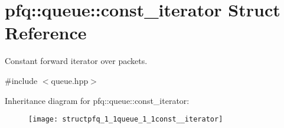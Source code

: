 \hypertarget{structpfq_1_1queue_1_1const__iterator}{\section{pfq\+:\+:queue\+:\+:const\+\_\+iterator Struct Reference}
\label{structpfq_1_1queue_1_1const__iterator}
}


Constant forward iterator over packets.  




{\ttfamily \#include $<$queue.\+hpp$>$}

Inheritance diagram for pfq\+:\+:queue\+:\+:const\+\_\+iterator\+:\begin{figure}[H]
\begin{center}
\leavevmode
\texttt{[image: structpfq\_1\_1queue\_1\_1const\_\_iterator]}
\end{center}
\end{figure}
